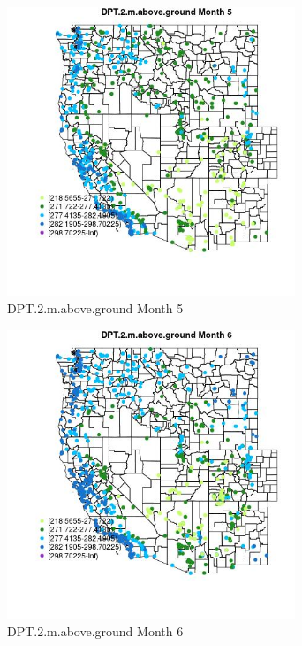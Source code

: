 \begin{figure} 
\centering  
\includegraphics[width=0.77\textwidth]{Code_Outputs/Report_ML_input_PM25_Step4_part_e_de_duplicated_aves_compiled_2019-05-21wNAs_MapObsMo5DPT2maboveground.jpg} 
\caption{\label{fig:Report_ML_input_PM25_Step4_part_e_de_duplicated_aves_compiled_2019-05-21wNAsMapObsMo5DPT2maboveground}DPT.2.m.above.ground Month 5} 
\end{figure} 
 

\clearpage 

\begin{figure} 
\centering  
\includegraphics[width=0.77\textwidth]{Code_Outputs/Report_ML_input_PM25_Step4_part_e_de_duplicated_aves_compiled_2019-05-21wNAs_MapObsMo6DPT2maboveground.jpg} 
\caption{\label{fig:Report_ML_input_PM25_Step4_part_e_de_duplicated_aves_compiled_2019-05-21wNAsMapObsMo6DPT2maboveground}DPT.2.m.above.ground Month 6} 
\end{figure} 
 

